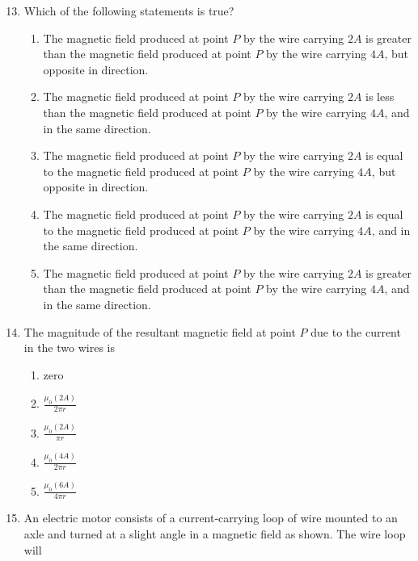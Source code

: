 \documentclass{../../oss-apphys}
\begin{document}
\begin{multicols}{2}
  \begin{enumerate}[leftmargin=18pt]
    \setcounter{enumi}{12}
  \item Which of the following statements is true?
    \begin{enumerate}[noitemsep,topsep=0pt,leftmargin=18pt,label=(\Alph*)]
    \item The magnetic field produced at point $P$ by the wire carrying $2A$ is
      greater than the magnetic field produced at point $P$ by the wire
      carrying $4A$, but opposite in direction.
    \item The magnetic field produced at point $P$ by the wire carrying $2A$ is
      less than the magnetic field produced at point $P$ by the wire carrying 
      $4A$, and in the same direction.
    \item The magnetic field produced at point $P$ by the wire carrying $2A$ is
      equal to the magnetic field produced at point $P$ by the wire carrying
      $4A$, but opposite in direction.
    \item The magnetic field produced at point $P$ by the wire carrying $2A$ is
      equal to the magnetic field produced at point $P$ by the wire carrying
      $4A$, and in the same direction.
    \item The magnetic field produced at point $P$ by the wire carrying $2A$ is
      greater than the magnetic field produced at point $P$ by the wire
      carrying $4A$, and in the same direction.
    \end{enumerate}

  \item The magnitude of the resultant magnetic field at point $P$ due to the
    current in the two wires is
    \begin{enumerate}[noitemsep,topsep=0pt,leftmargin=18pt,label=(\Alph*)]
    \item zero
    \item $\displaystyle\frac{\mu_0(2A)}{2\pi r}$
    \item $\displaystyle\frac{\mu_0(2A)}{\pi r}$
    \item $\displaystyle\frac{\mu_0(4A)}{2\pi r}$
    \item $\displaystyle\frac{\mu_0(6A)}{4\pi r}$
    \end{enumerate}

    \columnbreak

  \item An electric motor consists of a current-carrying loop of wire mounted
    to an axle and turned at a slight angle in a magnetic field as shown. The
    wire loop will
    

\end{enumerate}
\end{multicols}
\end{document}
